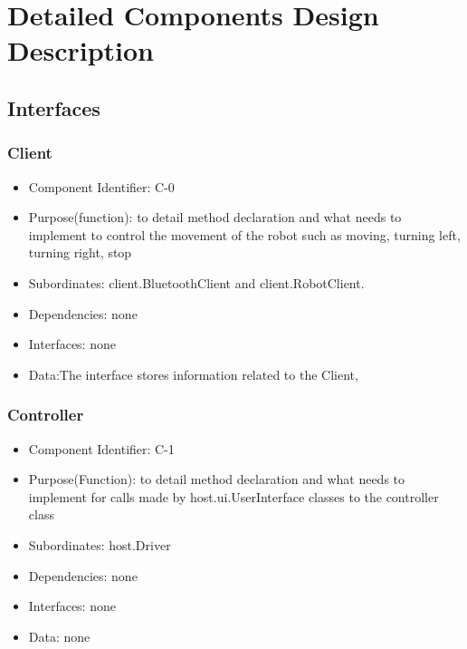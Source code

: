 \documentclass[11pt, a4paper]{report}
\begin{document}
\section{Detailed Components Design Description}
\subsection{Interfaces}
\subsubsection{Client}
\begin{itemize}
\item Component Identifier: C-0
\item Purpose(function): to detail method declaration and what needs to implement
to control the movement of the robot such as moving, turning left, turning right, stop
\item Subordinates: client.BluetoothClient and client.RobotClient.
\item Dependencies: none
\item Interfaces: none
\item Data:The interface stores information related to the Client, %
\end{itemize}

\subsubsection{Controller}
\begin{itemize}
\item Component Identifier: C-1
\item Purpose(Function): to detail method declaration and what needs to implement
for calls made by host.ui.UserInterface classes to the controller class
\item Subordinates: host.Driver
\item Dependencies: none
\item Interfaces: none
\item Data: none
\end{itemize}
\end{document}
